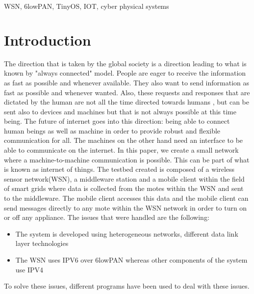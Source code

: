 \documentclass[conference]{IEEEtran}
\begin{document}
\begin{IEEEkeywords}
WSN, 6lowPAN, TinyOS, IOT, cyber physical systems
\end{IEEEkeywords}

\section{Introduction}
The direction that is taken by the global society is a direction leading to what is known by "always connected" model. People are eager to receive the information as fast as possible and whenever available. They also want to send information as fast as possible and whenever wanted. Also, these requests and responses that are dictated by the human are not all the time directed towards humans , but can be sent also to devices and machines but that is not always possible at this time being. The future  of internet goes into this direction: being able to connect human beings as well as machine in order to provide robust and flexible communication for all. The machines on the other hand need an interface to be able to communicate on the internet. In this paper, we create a small network where a machine-to-machine communication is possible. This can be part of what is known as internet of things. The testbed created is composed of a wireless sensor network(WSN), a middleware station and a mobile client within the field of smart grids where data is collected from the motes within the WSN and sent to the middleware. The mobile client accesses this data and the mobile client can send messages directly to any mote within the WSN network in order to turn on or off any appliance. The issues that were handled are the following:
\begin{itemize}
\item The system is developed using heterogeneous networks, different data link layer technologies
\item The WSN uses IPV6 over 6lowPAN whereas other components of the system use IPV4
\end{itemize}
To solve these issues, different programs have been used to deal with these issues. 
 
\end{document}

